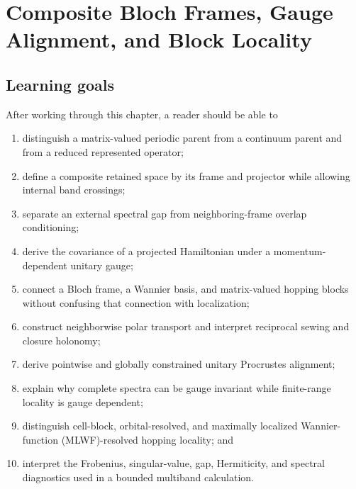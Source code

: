 \chapter{Composite Bloch Frames, Gauge Alignment, and Block Locality}

\label{ch:training-composite-band-gauge-alignment}


\section{Learning goals}

After working through this chapter, a reader should be able to

\begin{enumerate}
  \item distinguish a matrix-valued periodic parent from a continuum parent and
        from a reduced represented operator;
  \item define a composite retained space by its frame and projector while
        allowing internal band crossings;
  \item separate an external spectral gap from neighboring-frame overlap
        conditioning;
  \item derive the covariance of a projected Hamiltonian under a
        momentum-dependent unitary gauge;
  \item connect a Bloch frame, a Wannier basis, and matrix-valued hopping
        blocks without confusing that connection with localization;
  \item construct neighborwise polar transport and interpret reciprocal sewing
        and closure holonomy;
  \item derive pointwise and globally constrained unitary Procrustes alignment;
  \item explain why complete spectra can be gauge invariant while finite-range
        locality is gauge dependent;
  \item distinguish cell-block, orbital-resolved, and maximally localized
        Wannier-function (MLWF)-resolved hopping locality; and
  \item interpret the Frobenius, singular-value, gap, Hermiticity, and spectral
        diagnostics used in a bounded multiband calculation.
\end{enumerate}

